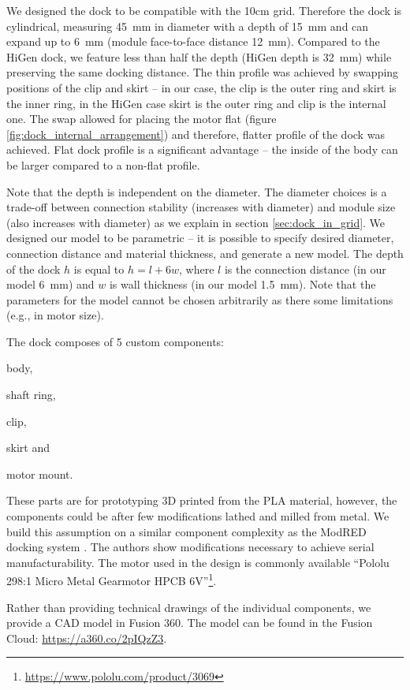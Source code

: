 We designed the dock to be compatible with the 10cm grid. Therefore the dock is
cylindrical, measuring 45~mm in diameter with a depth of 15~mm and can expand up
to 6~mm (module face-to-face distance 12~mm). Compared to the HiGen dock, we
feature less than half the depth (HiGen depth is 32~mm) while preserving the
same docking distance. The thin profile was achieved by swapping positions of
the clip and skirt -- in our case, the clip is the outer ring and skirt is the
inner ring, in the HiGen case skirt is the outer ring and clip is the internal
one. The swap allowed for placing the motor flat (figure
\ref{fig:dock_internal_arrangement}) and therefore, flatter profile of the dock
was achieved. Flat dock profile is a significant advantage -- the inside of the
body can be larger compared to a non-flat profile.

Note that the depth is independent on the diameter. The diameter choices is a
trade-off between connection stability (increases with diameter) and module size
(also increases with diameter) as we explain in section \ref{sec:dock_in_grid}.
We designed our model to be parametric -- it is possible to specify desired
diameter, connection distance and material thickness, and generate a new model.
The depth of the dock $h$ is equal to $h=l+6w$, where $l$ is the connection
distance (in our model 6~mm) and $w$ is wall thickness (in our model 1.5~mm).
Note that the parameters for the model cannot be chosen arbitrarily as there
some limitations (e.g., in motor size).

The dock composes of 5 custom components:
\begin{enumerate*}
    \item body,
    \item shaft ring,
    \item clip,
    \item skirt and
    \item motor mount.
\end{enumerate*}
These parts are for prototyping 3D printed from the PLA material, however, the
components could be after few modifications lathed and milled from metal. We
build this assumption on a similar component complexity as the ModRED docking
system \cite{hossain_towards_2014}. The authors show modifications necessary to
achieve serial manufacturability. The motor used in the design is commonly
available ``Pololu 298:1 Micro Metal Gearmotor HPCB
6V''\footnote{\url{https://www.pololu.com/product/3069}}.

Rather than providing technical drawings of the individual components, we
provide a CAD model in Fusion 360. The model can be found in the Fusion Cloud:
\url{https://a360.co/2pIQzZ3}.

